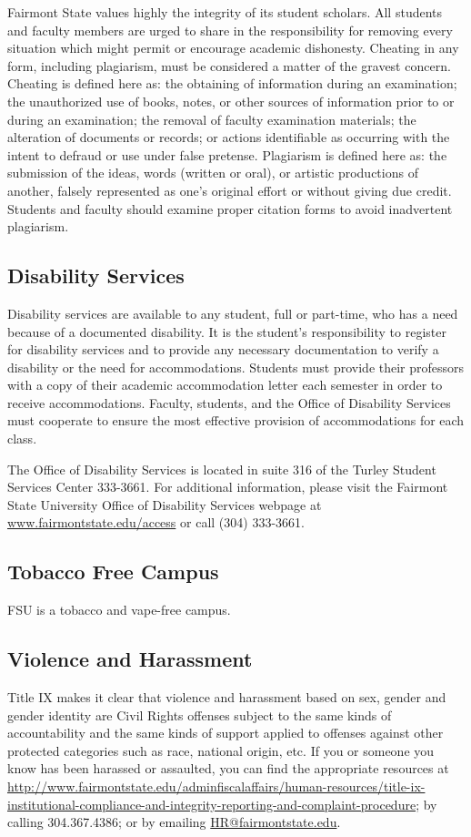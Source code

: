 Fairmont State values highly the integrity of its student scholars. All students and faculty members are urged to share in the responsibility for removing every situation which might permit or encourage academic dishonesty. Cheating in any form, including plagiarism, must be considered a matter of the gravest concern. Cheating is defined here as: the obtaining of information during an examination; the unauthorized use of books, notes, or other sources of information prior to or during an examination; the removal of faculty examination materials; the alteration of documents or records; or actions identifiable as occurring with the intent to defraud or use under false pretense. Plagiarism is defined here as: the submission of the ideas, words (written or oral), or artistic productions of another, falsely represented as one's original effort or without giving due credit. Students and faculty should examine proper citation forms to avoid inadvertent plagiarism.

\subsection{Disability Services}

Disability services are available to any student, full or part-time, who has a need because of a documented disability. It is the student's responsibility to register for disability services and to provide any necessary documentation to verify a disability or the need for accommodations. Students must provide their professors with a copy of their academic accommodation letter each semester in order to receive accommodations. Faculty, students, and the Office of Disability Services must cooperate to ensure the most effective provision of accommodations for each class.

The Office of Disability Services is located in suite 316 of the Turley Student Services Center 333-3661. For additional information, please visit the Fairmont State University Office of Disability Services webpage at \url{www.fairmontstate.edu/access} or call (304) 333-3661.

\subsection{Tobacco Free Campus}

FSU is a tobacco and vape-free campus.

\subsection{Violence and Harassment}

Title IX makes it clear that violence and harassment based on sex, gender and gender identity are Civil Rights offenses subject to the same kinds of accountability and the same kinds of support applied to offenses against other protected categories such as race, national origin, etc. If you or someone you know has been harassed or assaulted, you can find the appropriate resources at \url{http://www.fairmontstate.edu/adminfiscalaffairs/human-resources/title-ix-institutional-compliance-and-integrity-reporting-and-complaint-procedure}; by calling 304.367.4386; or by emailing \url{HR@fairmontstate.edu}.

